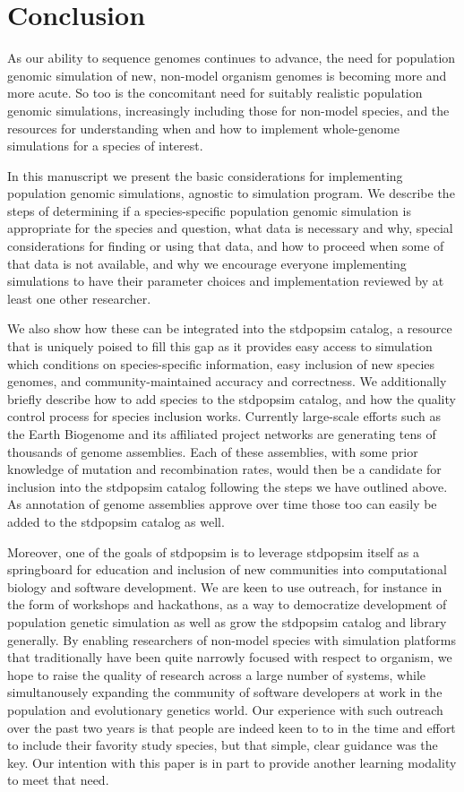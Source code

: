 \documentclass[hidelinks]{article}
\begin{document}
\hypertarget{conclusion}{%
\section*{Conclusion}\label{conclusion}}

As our ability to sequence genomes continues to advance, the need for
population genomic simulation of new, non-model organism genomes is
becoming more and more acute. So too is the concomitant need for
suitably realistic population genomic simulations, increasingly
including those for non-model species, and the resources for
understanding when and how to implement whole-genome simulations for a
species of interest.

In this manuscript we present the basic considerations for implementing
population genomic simulations, agnostic to simulation program. We
describe the steps of determining if a species-specific population
genomic simulation is appropriate for the species and question, what
data is necessary and why, special considerations for finding or using
that data, and how to proceed when some of that data is not available,
and why we encourage everyone implementing simulations to have their
parameter choices and implementation reviewed by at least one other
researcher.

We also show how these can be integrated into the stdpopsim catalog, a
resource that is uniquely poised to fill this gap as it provides easy
access to simulation which conditions on species-specific information,
easy inclusion of new species genomes, and community-maintained accuracy
and correctness. We additionally briefly describe how to add species to
the stdpopsim catalog, and how the quality control process for species
inclusion works. Currently large-scale efforts such as the Earth Biogenome
and its affiliated project networks are generating tens of thousands of genome
assemblies. Each of these assemblies, with some prior knowledge of mutation and
recombination rates, would then be a candidate for inclusion into the
stdpopsim catalog following the steps we have outlined above. As
annotation of genome assemblies approve over time those too can easily
be added to the stdpopsim catalog as well.

Moreover, one of the goals of stdpopsim is to leverage stdpopsim itself
as a springboard for education and inclusion of new communities into
computational biology and software development. We are keen to use
outreach, for instance in the form of workshops and hackathons, as a way
to democratize development of population genetic simulation as well as
grow the stdpopsim catalog and library generally. By enabling
researchers of non-model species with simulation platforms that
traditionally have been quite narrowly focused with respect to organism,
we hope to raise the quality of research across a large number of
systems, while simultanousely expanding the community of software
developers at work in the population and evolutionary genetics world.
Our experience with such outreach over the past two years is that people
are indeed keen to to in the time and effort to include their favority
study species, but that simple, clear guidance was the key. Our
intention with this paper is in part to provide another learning
modality to meet that need.
\end{document}
